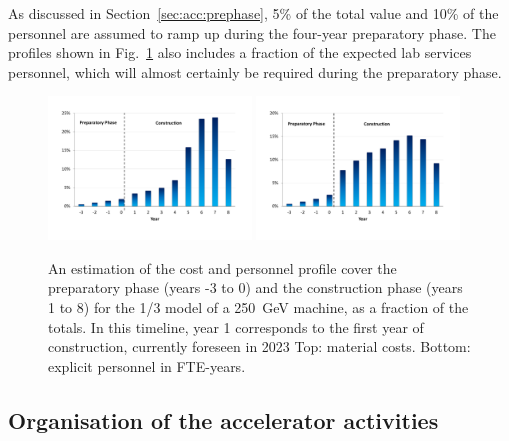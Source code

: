 \documentclass[%
 reprint,
 floatfix,
 amsmath,amssymb,
 aps,
]{revtex4-1}
\begin{document}
As discussed in Section~\ref{sec:acc:prephase}, 5\% of the total value and 10\% of the personnel are assumed
to ramp up during the four-year preparatory phase. The profiles shown in Fig.~\ref{fig:costprofile:costprofile} also includes a fraction
of the expected lab services personnel, which will almost certainly be required during the preparatory
phase. 

\begin{figure}[htbp]
\includegraphics[width=0.48\textwidth]{figures/ilc-eu-ikc-cost-profile-blue-250me.pdf}
\includegraphics[width=0.48\textwidth]{figures/ilc-eu-ikc-cost-profile-blue-fte.pdf}
\caption{\label{fig:costprofile:costprofile} An estimation of the cost and personnel profile cover the preparatory phase (years -3 to 0) 
and the construction phase (years 1 to 8) for the 1/3 model of a 250~GeV machine, as a fraction of the
totals. In this timeline, 
year 1 corresponds to the first year of construction, currently foreseen in 2023 
Top: material costs. Bottom: explicit personnel in FTE-years.
}
\end{figure}


\subsection{\label{sec:acc:org}Organisation of the accelerator activities}
\end{document}
